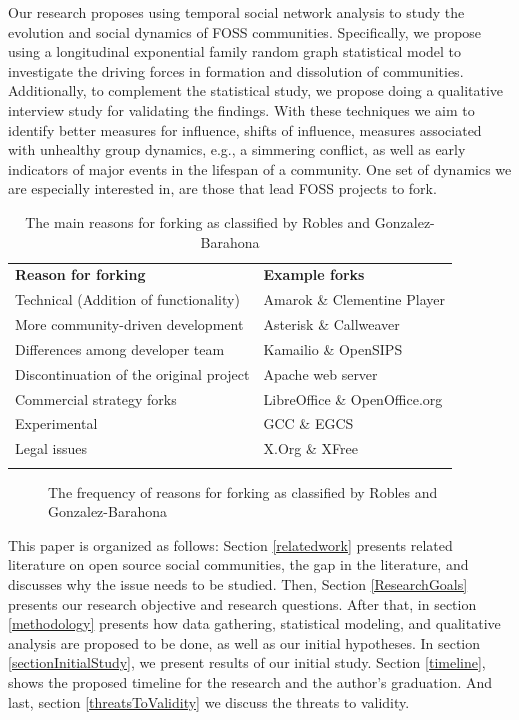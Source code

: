 \documentclass{acm_proc_article-sp}
\begin{document}
Our research proposes using temporal social network analysis to study the evolution and social dynamics of FOSS communities. Specifically, we propose using a longitudinal exponential family random graph statistical model to investigate the driving forces in formation and dissolution of communities. Additionally,  to complement the statistical study, we propose doing a qualitative interview study for validating the findings. With these techniques we aim to identify better measures for influence, shifts of influence, measures associated with unhealthy group dynamics, e.g., a simmering conflict, as well as early indicators of major events in the lifespan of a community. One set of dynamics we are especially interested in, are those that lead FOSS projects to fork.

\begin{table}[!ht]
\centering
\caption{The main reasons for forking as classified by Robles and Gonzalez-Barahona \cite{Robles}}
\label{tableReasonsForForking}
\begin{tabular}{p{} p{}}
\hline\noalign{\smallskip}
\textbf{Reason for forking} & \textbf{Example forks} \\
\noalign{\smallskip}\hline\noalign{\smallskip}
Technical (Addition of functionality) & Amarok \& Clementine Player \\ \hline
More community-driven development & Asterisk \& Callweaver \\ \hline
Differences among developer team & Kamailio \& OpenSIPS \\ \hline
Discontinuation of the original project & Apache web server \\ \hline
Commercial strategy forks & LibreOffice \& OpenOffice.org \\ \hline
Experimental & GCC \& EGCS \\ \hline
Legal issues & X.Org \& XFree\\
\noalign{\smallskip}\hline
\end{tabular}
\end{table}

\begin{figure} [!ht]
\centering
\caption{The frequency of reasons for forking as classified by Robles and Gonzalez-Barahona \cite{Robles}}
\label{figureReasonsForForkingPieChart}
\end{figure}

This paper is organized as follows: Section \ref{relatedwork} presents related literature on open source social communities, the gap in the literature, and discusses why the issue needs to be studied. 
Then, Section \ref{ResearchGoals} presents our research objective and research questions. After that, in section \ref{methodology} presents how data gathering, statistical modeling, and qualitative analysis are proposed to be done, as well as our initial hypotheses. In section \ref{sectionInitialStudy}, we present results of our initial study. Section \ref{timeline}, shows the proposed timeline for the research and the author's graduation. And last, section \ref{threatsToValidity} we discuss the threats to validity. 
\end{document}
